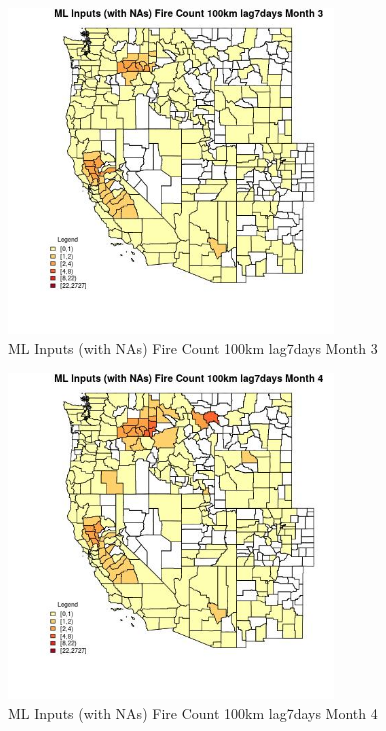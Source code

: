 \begin{figure} 
\centering  
\includegraphics[width=0.77\textwidth]{Code_Outputs/Report_ML_input_PM25_Step4_part_f_de_duplicated_aveswNAs_CountyFire_Count_100km_lag7daysmedianMonth3.jpg} 
\caption{\label{fig:Report_ML_input_PM25_Step4_part_f_de_duplicated_aveswNAsCountyFire_Count_100km_lag7daysmedianMonth3}ML Inputs (with NAs) Fire Count 100km lag7days Month 3} 
\end{figure} 
 

\begin{figure} 
\centering  
\includegraphics[width=0.77\textwidth]{Code_Outputs/Report_ML_input_PM25_Step4_part_f_de_duplicated_aveswNAs_CountyFire_Count_100km_lag7daysmedianMonth4.jpg} 
\caption{\label{fig:Report_ML_input_PM25_Step4_part_f_de_duplicated_aveswNAsCountyFire_Count_100km_lag7daysmedianMonth4}ML Inputs (with NAs) Fire Count 100km lag7days Month 4} 
\end{figure} 
 

